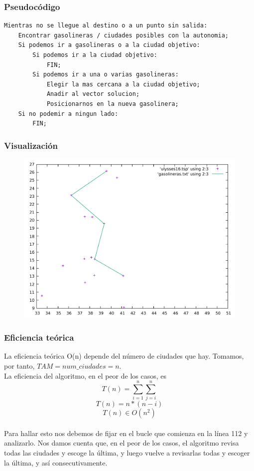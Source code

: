 \documentclass[11pt,a4paper]{article} %
\begin{document}
\subsubsection{Pseudocódigo}
\begin{lstlisting}
Mientras no se llegue al destino o a un punto sin salida:
	Encontrar gasolineras / ciudades posibles con la autonomia;
	Si podemos ir a gasolineras o a la ciudad objetivo:
		Si podemos ir a la ciudad objetivo:
			FIN;
		Si podemos ir a una o varias gasolineras:
			Elegir la mas cercana a la ciudad objetivo;
			Anadir al vector solucion;
			Posicionarnos en la nueva gasolinera;
	Si no podemir a ningun lado:
		FIN;
\end{lstlisting}



\subsubsection{Visualización}
\begin{figure}[H]
	\centering
	\includegraphics[width=13cm]{data/graphics/gasolineras/gasolineras.pdf}
\end{figure}

\subsubsection{Eficiencia teórica}
La eficiencia teórica O(n) depende del número de ciudades que hay. Tomamos, por tanto, $TAM = num\_ciudades = n$.\\

La eficiencia del algoritmo, en el peor de los casos, es 
$$T(n) = \sum_{i=1}^{n}\sum_{j=i}^{n}$$
$$T(n) = n*(n-i)$$
$$T(n) \in O(n^2)$$\\

Para hallar esto nos debemos de fijar en el bucle que comienza en la línea 112 y analizarlo. Nos damos cuenta que, en el peor de los casos, el algoritmo revisa todas las ciudades y escoge la última, y luego vuelve a revisarlas todas y escoger la última, y así consecutivamente.



\end{document}
